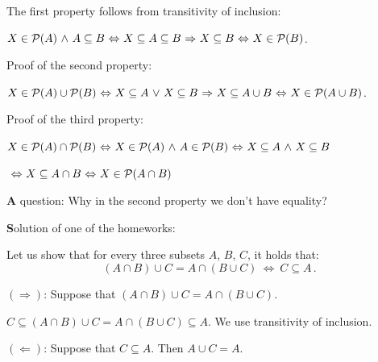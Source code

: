 \documentclass[11pt,paper=b5,footinclude,headinclude]{scrbook} %
\def\P {{\cal P}}
\def\ali {{~\vee~}}
\def\inn {{~\wedge~}}
\def\sledi {{~\Rightarrow~}}
\def\cee {{~\Leftrightarrow~}}
\theoremstyle{remark}
\theoremstyle{definition} %
\begin{document}
The first property follows from transitivity of inclusion:

$X\in \P(A) \inn A\subseteq B\cee X\subseteq A\subseteq B\sledi X\subseteq B\cee X\in \P(B)$.

Proof of the second property:

$X\in \P(A) \cup \P(B) \cee X\subseteq A\ali X\subseteq B\sledi X\subseteq A\cup B\cee X\in \P(A\cup B)$.

Proof of the third property:

$X\in \P(A)\cap \P(B)\cee X\in \P(A) \inn A\in \P(B)\cee X\subseteq A \inn X\subseteq B$

$\cee X\subseteq A \cap B\cee X\in \P(A\cap B)$

%

{\textbf A question:} Why in the second property we don't have equality?



\bigskip

%
%
%
%
%
%
%
%
%
%
%
%
%

{\textbf Solution of one of the homeworks:}

Let us show that for every three subsets $A$, $B$, $C$, it holds that:
$$(A\cap B)\cup C = A\cap (B\cup C) \cee C\subseteq A\,.$$

\medskip
$(\Rightarrow)$:
Suppose that $(A\cap B)\cup C = A\cap (B\cup C)$.

$C\subseteq (A\cap B)\cup C = A\cap (B\cup C)\subseteq A$. We use transitivity of inclusion.

\medskip
$(\Leftarrow)$:
Suppose that $C\subseteq A$. Then $A\cup C = A$.
\end{document}
